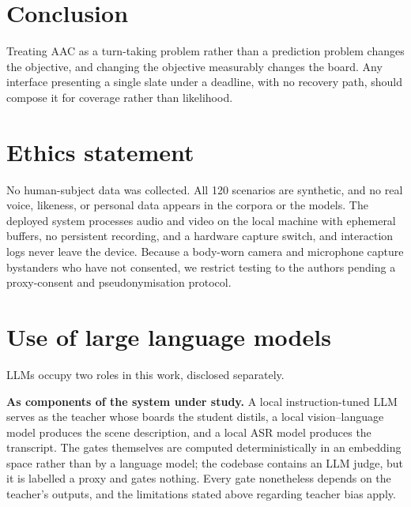 \section{Conclusion}

Treating AAC as a turn-taking problem rather than a prediction problem changes
the objective, and changing the objective measurably changes the board. Any
interface presenting a single slate under a deadline, with no recovery path,
should compose it for coverage rather than likelihood.

\section*{Ethics statement}

No human-subject data was collected. All 120 scenarios are synthetic, and no real
voice, likeness, or personal data appears in the corpora or the models. The
deployed system processes audio and video on the local machine with ephemeral
buffers, no persistent recording, and a hardware capture switch, and interaction
logs never leave the device. Because a body-worn camera and microphone capture
bystanders who have not consented, we restrict testing to the authors pending a
proxy-consent and pseudonymisation protocol.

\section*{Use of large language models}

LLMs occupy two roles in this work, disclosed separately.

\textbf{As components of the system under study.} A local instruction-tuned LLM
serves as the teacher whose boards the student distils, a local vision--language
model produces the scene description, and a local ASR model produces the
transcript. The gates themselves are computed deterministically in an embedding
space rather than by a language model; the codebase contains an LLM judge, but it
is labelled a proxy and gates nothing. Every gate nonetheless depends on the
teacher's outputs, and the limitations stated above regarding teacher bias apply.

